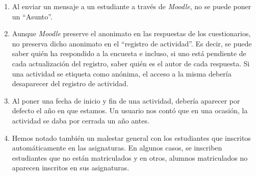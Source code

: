 \begin{enumerate}

\item Al enviar un mensaje a un estudiante a través de \textit{Moodle}, no se puede poner un ``Asunto''. %

\item Aunque \textit{Moodle} preserve el anonimato en las respuestas de los cuestionarios, no preserva dicho anonimato en el ``registro de actividad''. Es decir, se puede saber quién ha respondido a la encuesta e incluso, si uno está pendiente de cada actualización del registro, saber quién es el autor de cada respuesta. Si una actividad se etiqueta como anónima, el acceso a la misma debería desaparecer del registro de actividad.


\item Al poner una fecha de inicio y fin de una actividad, debería aparecer por defecto el año en que estamos. Un usuario nos contó que en una ocasión, la actividad se daba por cerrada un año antes.


\item Hemos notado también un malestar general con los estudiantes que inscritos automáticamente en las asignaturas. En algunos casos, se inscriben estudiantes que no están matriculados y en otros, alumnos matriculados no aparecen inscritos en sus asignaturas.



\end{enumerate}

